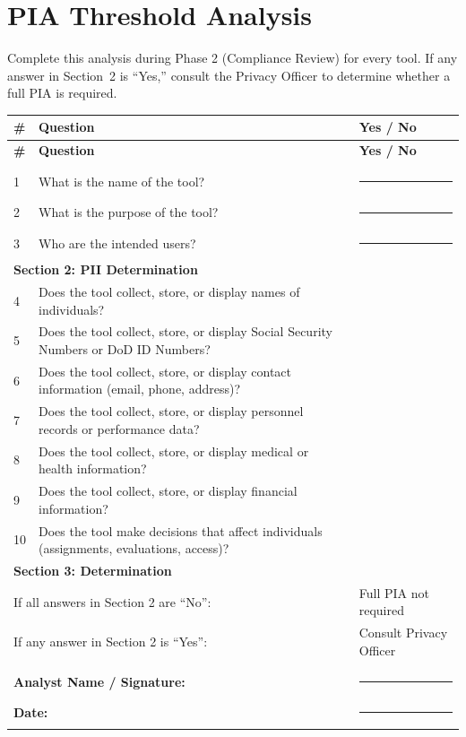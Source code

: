 \documentclass[11pt,letterpaper]{article}
\begin{document}
\section{PIA Threshold Analysis}
\label{app:pia-threshold}

Complete this analysis during Phase 2 (Compliance Review) for every tool. If any answer in Section~2 is ``Yes,'' consult the Privacy Officer to determine whether a full PIA is required.

\begin{longtable}{@{}p{0.6cm}p{10cm}p{2.5cm}@{}}
\toprule
\textbf{\#} & \textbf{Question} & \textbf{Yes / No} \\
\midrule
\endfirsthead
\toprule
\textbf{\#} & \textbf{Question} & \textbf{Yes / No} \\
\midrule
\endhead
\bottomrule
\endlastfoot
\multicolumn{3}{l}{\textbf{Section 1: System Description}} \\
\midrule
1 & What is the name of the tool? & \rule{2cm}{0.4pt} \\
\midrule
2 & What is the purpose of the tool? & \rule{2cm}{0.4pt} \\
\midrule
3 & Who are the intended users? & \rule{2cm}{0.4pt} \\
\midrule
\multicolumn{3}{l}{\textbf{Section 2: PII Determination}} \\
\midrule
4 & Does the tool collect, store, or display names of individuals? & \\
\midrule
5 & Does the tool collect, store, or display Social Security Numbers or DoD ID Numbers? & \\
\midrule
6 & Does the tool collect, store, or display contact information (email, phone, address)? & \\
\midrule
7 & Does the tool collect, store, or display personnel records or performance data? & \\
\midrule
8 & Does the tool collect, store, or display medical or health information? & \\
\midrule
9 & Does the tool collect, store, or display financial information? & \\
\midrule
10 & Does the tool make decisions that affect individuals (assignments, evaluations, access)? & \\
\midrule
\multicolumn{3}{l}{\textbf{Section 3: Determination}} \\
\midrule
\multicolumn{2}{l}{If all answers in Section 2 are ``No'':} & Full PIA not required \\
\midrule
\multicolumn{2}{l}{If any answer in Section 2 is ``Yes'':} & Consult Privacy Officer \\
\midrule
\multicolumn{3}{l}{} \\
\midrule
\multicolumn{2}{l}{\textbf{Analyst Name / Signature:}} & \rule{2cm}{0.4pt} \\
\midrule
\multicolumn{2}{l}{\textbf{Date:}} & \rule{2cm}{0.4pt} \\
\end{longtable}
\end{document}
